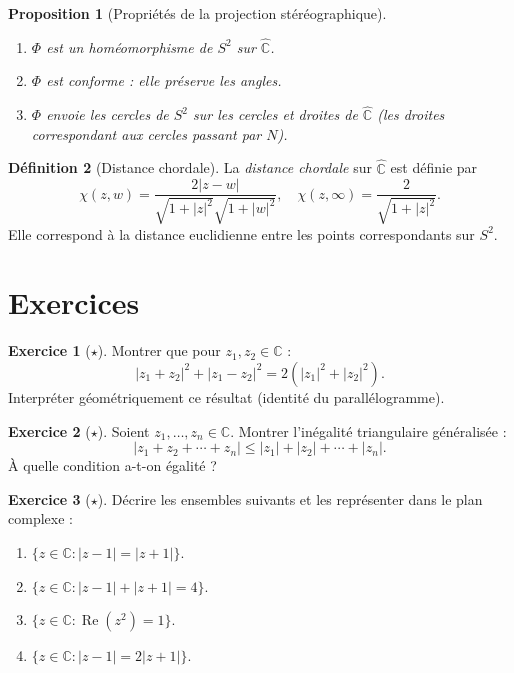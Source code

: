 \documentclass[12pt,a4paper,openany]{book}
\theoremstyle{definition}
\newtheorem{definition}{Définition}[chapter]
\newtheorem{exercice}{Exercice}[chapter]
\theoremstyle{plain}
\newtheorem{proposition}[definition]{Proposition}
\theoremstyle{remark}
\newcommand{\C}{\mathbb{C}}
\DeclareMathOperator{\re}{Re}
\newcommand{\abs}[1]{\left|#1\right|}
\begin{document}
\begin{proposition}[Propriétés de la projection stéréographique]\label{prop:stereo-proprietes}
\begin{enumerate}[label=(\roman*)]
  \item $\Phi$ est un homéomorphisme de $S^2$ sur $\hat{\C}$.
  \item $\Phi$ est conforme : elle préserve les angles.
  \item $\Phi$ envoie les cercles de $S^2$ sur les cercles et droites de $\hat{\C}$ (les droites correspondant aux cercles passant par $N$).
\end{enumerate}
\end{proposition}

\begin{definition}[Distance chordale]\label{def:distance-chordale}
La \emph{distance chordale} sur $\hat{\C}$ est définie par
\[
  \chi(z,w) = \frac{2\abs{z-w}}{\sqrt{1+\abs{z}^2}\sqrt{1+\abs{w}^2}},
  \quad \chi(z,\infty) = \frac{2}{\sqrt{1+\abs{z}^2}}.
\]
Elle correspond à la distance euclidienne entre les points correspondants sur $S^2$.
\end{definition}

\section{Exercices}\label{sec:exo-ch1}

\begin{exercice}[$\star$]\label{exo:module-somme}
Montrer que pour $z_1, z_2 \in \C$ :
\[
  \abs{z_1 + z_2}^2 + \abs{z_1 - z_2}^2 = 2(\abs{z_1}^2 + \abs{z_2}^2).
\]
Interpréter géométriquement ce résultat (identité du parallélogramme).
\end{exercice}

\begin{exercice}[$\star$]\label{exo:inegalite-module}
Soient $z_1, \ldots, z_n \in \C$. Montrer l'inégalité triangulaire généralisée :
\[
  \abs{z_1 + z_2 + \cdots + z_n} \leq \abs{z_1} + \abs{z_2} + \cdots + \abs{z_n}.
\]
À quelle condition a-t-on égalité ?
\end{exercice}

\begin{exercice}[$\star$]\label{exo:lieux-geometriques}
Décrire les ensembles suivants et les représenter dans le plan complexe :
\begin{enumerate}[label=(\alph*)]
  \item $\{z \in \C : \abs{z - 1} = \abs{z + 1}\}$.
  \item $\{z \in \C : \abs{z - 1} + \abs{z + 1} = 4\}$.
  \item $\{z \in \C : \re(z^2) = 1\}$.
  \item $\{z \in \C : \abs{z - 1} = 2\abs{z + 1}\}$.
\end{enumerate}
\end{exercice}
\end{document}
